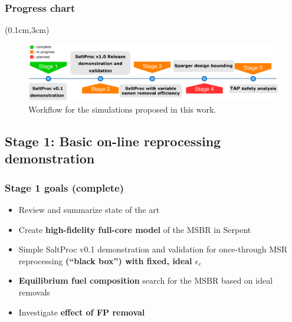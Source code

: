 

\begin{frame}
  \frametitle{Progress chart}       
  	  \begin{textblock*}{12.5cm}(0.1cm,3cm) %
 \begin{figure}[ht!] %
	\includegraphics[width=\textwidth]{./images/progress_chart_light.pdf} 
	\caption{Workflow for the simulations proposed in this work.}
\end{figure}
		\end{textblock*}
\end{frame}


\subsection{Stage 1: Basic on-line reprocessing demonstration}


\begin{frame}
\frametitle{Stage 1 goals (complete)}
	\begin{itemize}
		\itemsep1em
		\item Review and summarize state of the art
		\item Create \textbf{high-fidelity full-core model} of the \gls{MSBR} 
		in Serpent
		\item Simple SaltProc v0.1 demonstration and validation for 
		once-through \gls{MSR} reprocessing \textbf{(``black box'') with 
		fixed, ideal $\epsilon_e$}
		\item \textbf{Equilibrium fuel composition} search for the \gls{MSBR} 
		based on ideal removals
		\item Investigate \textbf{effect of \gls{FP} removal}
	\end{itemize}

\end{frame}

